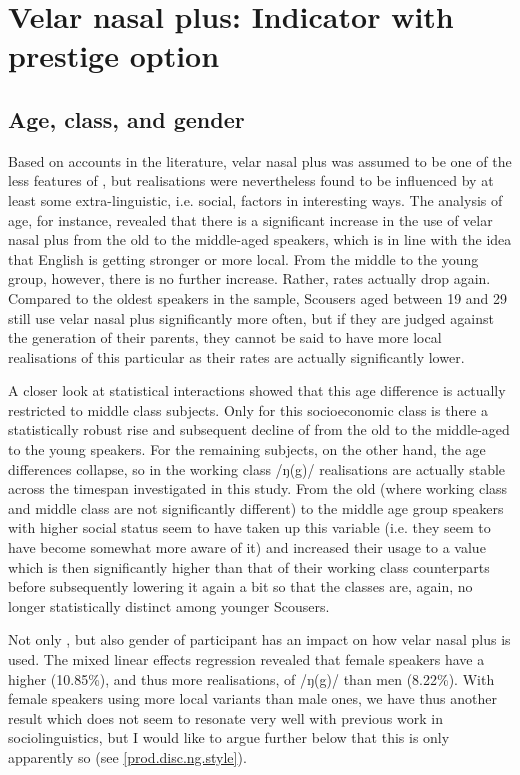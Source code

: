 \section{Velar nasal plus: Indicator with prestige option}
\label{prod.disc.ng}

\subsection{Age, class, and gender}
\label{prod.disc.ng.social}

Based on accounts in the literature, velar nasal plus was assumed to be one of the less  features of , but realisations were nevertheless found to be influenced by at least some extra-linguistic, i.e. social, factors in interesting ways.
The analysis of age, for instance, revealed that there is a significant increase in the use of velar nasal plus from the old to the middle-aged speakers, which is in line with the idea that  English is getting stronger or more local.
From the middle to the young group, however, there is no further increase.
Rather,  rates actually drop again.
Compared to the oldest speakers in the sample, Scousers aged between 19 and 29 still use velar nasal plus significantly more often, but if they are judged against the generation of their parents, they cannot be said to have more local realisations of this particular  as their rates are actually significantly lower.

A closer look at statistical interactions showed that this age difference is actually restricted to middle class subjects.
Only for this socioeconomic class is there a statistically robust rise and subsequent decline of  from the old to the middle-aged to the young speakers.
For the remaining subjects, on the other hand, the age differences collapse, so in the working class /ŋ(g)/ realisations are actually stable across the timespan investigated in this study.
From the old (where working class and middle class are not significantly different) to the middle age group speakers with higher social status seem to have taken up this variable (i.e. they seem to have become somewhat more aware of it) and increased their usage to a value which is then significantly higher than that of their working class counterparts before subsequently lowering it again a bit so that the classes are, again, no longer statistically distinct among younger Scousers.

Not only , but also gender of participant has an impact on how velar nasal plus is used.
The mixed linear effects regression revealed that female speakers have a higher  (10.85\%), and thus more  realisations, of /ŋ(g)/ than men (8.22\%).
With female speakers using more local variants than male ones, we have thus another result which does not seem to resonate very well with previous work in sociolinguistics, but I would like to argue further below that this is only apparently so (see \ref{prod.disc.ng.style}).

